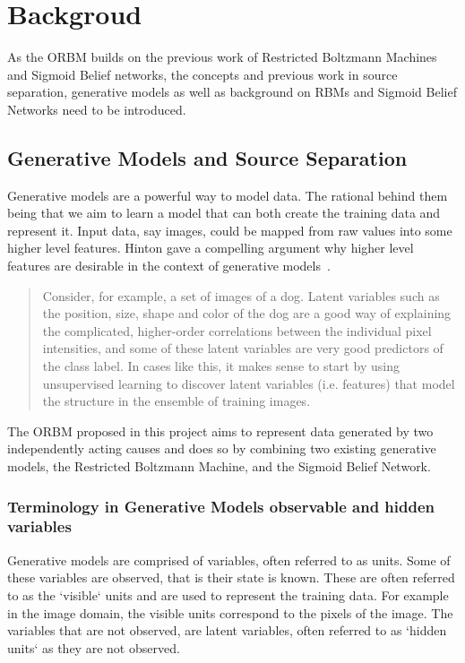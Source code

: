 \chapter{Backgroud}

 As the ORBM builds on the previous work of Restricted Boltzmann Machines and Sigmoid Belief networks, the concepts and previous work in source separation, generative models as well as background on RBMs and Sigmoid Belief Networks need to be introduced.


\section{Generative Models and Source Separation}

Generative models are a powerful way to model data. The rational behind them being that we aim to learn a model that can both create the training data and represent it. Input data, say images, could be mapped from raw values into some higher level features. Hinton gave a compelling argument why higher level features are desirable in the context of generative models~\cite{hinton:32723:vv}. \begin{quote} Consider, for example, a set of images of a dog. Latent variables such as the position, size, shape and color of the dog are a good way of explaining the complicated, higher-order correlations between the individual pixel intensities, and some of these latent variables are very good predictors of the class label. In cases like this, it makes sense to start by using unsupervised learning to discover latent variables (i.e. features) that model the structure in the ensemble of training images.\end{quote}

The ORBM proposed in this project aims to represent data generated by two independently acting causes and does so by combining two existing generative models, the Restricted Boltzmann Machine, and the Sigmoid Belief Network.

\subsection{Terminology in Generative Models observable and hidden variables}

Generative models are comprised of variables, often referred to as units. Some of these variables are observed, that is their state is known. These are often referred to as the `visible` units and are used to represent the training data. For example in the image domain, the visible units correspond to the pixels of the image. The variables that are not observed, are latent variables, often referred to as `hidden units` as they are not observed.

